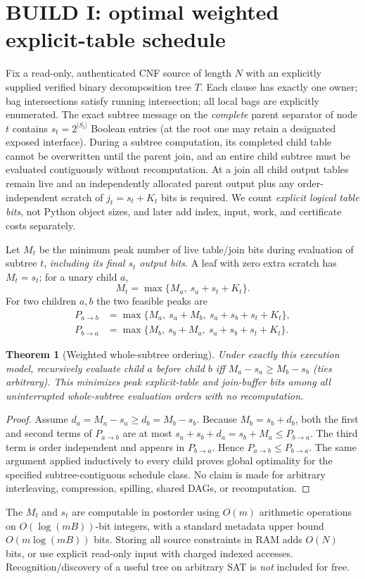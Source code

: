 \documentclass[11pt]{article}
\newtheorem{theorem}{Theorem}
\begin{document}
\section{BUILD I: optimal weighted explicit-table schedule}
Fix a read-only, authenticated CNF source of length $N$ with an explicitly supplied verified binary decomposition tree $T$. Each clause has exactly one owner; bag intersections satisfy running intersection; all local bags are explicitly enumerated. The exact subtree message on the \emph{complete} parent separator of node $t$ contains $s_t=2^{|S_t|}$ Boolean entries (at the root one may retain a designated exposed interface). During a subtree computation, its completed child table cannot be overwritten until the parent join, and an entire child subtree must be evaluated contiguously without recomputation. At a join all child output tables remain live and an independently allocated parent output plus any order-independent scratch of $j_t=s_t+K_t$ bits is required. We count \emph{explicit logical table bits}, not Python object sizes, and later add index, input, work, and certificate costs separately.

Let $M_t$ be the minimum peak number of live table/join bits during evaluation of subtree $t$, \emph{including its final $s_t$ output bits}. A leaf with zero extra scratch has $M_t=s_t$; for a unary child $a$,
\[M_t=\max\{M_a,\ s_a+s_t+K_t\}.\]
For two children $a,b$ the two feasible peaks are
\begin{align}
 P_{a\rightarrow b}&=\max\{M_a,\ s_a+M_b,\ s_a+s_b+s_t+K_t\},\\
 P_{b\rightarrow a}&=\max\{M_b,\ s_b+M_a,\ s_a+s_b+s_t+K_t\}.
\end{align}
\begin{theorem}[Weighted whole-subtree ordering]
Under exactly this execution model, recursively evaluate child $a$ before child $b$ iff $M_a-s_a\ge M_b-s_b$ (ties arbitrary). This minimizes peak \emph{explicit-table and join-buffer bits} among all uninterrupted whole-subtree evaluation orders with no recomputation.
\end{theorem}
\begin{proof}
Assume $d_a=M_a-s_a\ge d_b=M_b-s_b$. Because $M_b=s_b+d_b$, both the first and second terms of $P_{a\to b}$ are at most $s_a+s_b+d_a=s_b+M_a\le P_{b\to a}$. The third term is order independent and appears in $P_{b\to a}$. Hence $P_{a\to b}\le P_{b\to a}$. The same argument applied inductively to every child proves global optimality for the specified subtree-contiguous schedule class. No claim is made for arbitrary interleaving, compression, spilling, shared DAGs, or recomputation.
\end{proof}
The $M_t$ and $s_t$ are computable in postorder using $O(m)$ arithmetic operations on $O(\log(mB))$-bit integers, with a standard metadata upper bound $O(m\log(mB))$ bits. Storing all source constraints in RAM adds $O(N)$ bits, or use explicit read-only input with charged indexed accesses. Recognition/discovery of a useful tree on arbitrary SAT is \emph{not} included for free.
\end{document}
